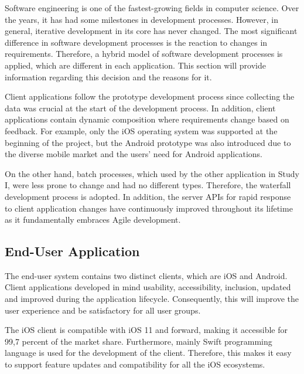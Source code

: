 Software engineering is one of the fastest-growing fields in computer science. Over the years, it has had some milestones in development processes. However, in general, iterative development in its core has never changed. The most significant difference in software development processes is the reaction to changes in requirements. Therefore,  a hybrid model of software development processes is applied, which are different in each application. This section will provide information regarding this decision and the reasons for it.

Client applications follow the prototype development process since collecting the data was crucial at the start of the development process. In addition, client applications contain dynamic composition where requirements change based on feedback. For example, only the iOS operating system was supported at the beginning of the project, but the Android prototype was also introduced due to the diverse mobile market and the users' need for Android applications.

On the other hand, batch processes, which used by the other application in Study I, were less prone to change and had no different types. Therefore, the waterfall development process is adopted. In addition, the server APIs for rapid response to client application changes have continuously improved throughout its lifetime as it fundamentally embraces Agile development.

\subsection{End-User Application}

The end-user system contains two distinct clients, which are iOS and Android. Client applications developed in mind usability, accessibility, inclusion, updated and improved during the application lifecycle. Consequently, this will improve the user experience and be satisfactory for all user groups.

The iOS client is compatible with iOS 11 and forward, making it accessible for 99,7 percent of the market share. Furthermore, mainly Swift programming language is used for the development of the client. Therefore, this makes it easy to support feature updates and compatibility for all the iOS ecosystems. 

